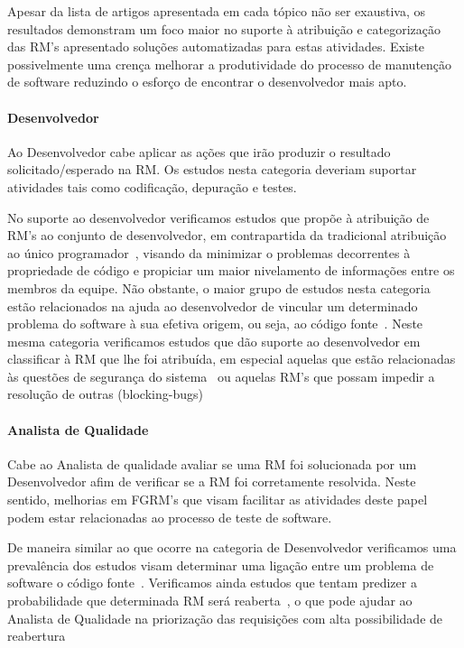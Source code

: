 Apesar da lista de artigos apresentada em cada tópico não ser exaustiva, os
resultados demonstram um foco maior no suporte à atribuição e categorização das
RM's apresentado soluções automatizadas para estas atividades. Existe
possivelmente uma crença melhorar a produtividade do processo de manutenção de
software reduzindo o esforço de encontrar o desenvolvedor mais apto.

\paragraph{Desenvolvedor}
Ao Desenvolvedor cabe aplicar as ações que irão produzir o resultado
solicitado/esperado na RM. Os estudos nesta categoria deveriam suportar
atividades tais como codificação, depuração e testes. 

No suporte ao desenvolvedor verificamos estudos que propõe à atribuição de RM's
ao conjunto de desenvolvedor, em contrapartida da tradicional atribuição ao
único programador~\cite{banitaan2013decoba}, visando da minimizar o problemas
decorrentes à propriedade de código e propiciar um maior nivelamento de
informações entre os membros da equipe. Não obstante, o maior grupo de estudos
nesta categoria estão relacionados na ajuda ao desenvolvedor de vincular um
determinado problema do software à sua efetiva origem, ou seja, ao código
fonte~\cite{corley2011recovering,Wong:2014:BBF:2705615.2706096,
	Thung:2014:BIT:2635868.2661678,Nguyen:2012:MAR:2393596.2393671,thung2013automatic,
	Romo:2015:TAT:2745802.2745833}. Neste mesma categoria verificamos estudos
que dão suporte ao desenvolvedor em classificar à RM que lhe foi atribuída, em
especial aquelas que estão relacionadas às questões de segurança do
sistema~\cite{gegick2010identifying} ou aquelas RM's que possam impedir a
resolução de outras
(blocking-bugs)~\cite{ValdiviaGarcia:2014:CPB:2597073.2597099}

\paragraph{Analista de Qualidade}
Cabe ao Analista de qualidade avaliar se uma RM foi solucionada por um
Desenvolvedor afim de verificar se a RM foi corretamente resolvida. Neste
sentido, melhorias em FGRM's que visam facilitar as atividades deste papel podem
estar relacionadas ao processo de teste de software.

De maneira similar ao que ocorre na categoria de Desenvolvedor verificamos uma
prevalência dos estudos visam determinar uma ligação entre um problema de
software o código
fonte~\cite{corley2011recovering,Wong:2014:BBF:2705615.2706096,
	Thung:2014:BIT:2635868.2661678,Nguyen:2012:MAR:2393596.2393671,thung2013automatic,
	Romo:2015:TAT:2745802.2745833}. Verificamos ainda estudos que tentam
predizer a probabilidade que determinada RM será
reaberta~\cite{xia2015automatic}, o que pode ajudar ao
Analista de Qualidade na priorização das requisições com alta possibilidade de
reabertura


